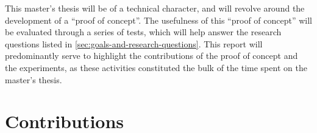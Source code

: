 \begin{comment}
What methodology will you apply to address the goals: theoretic/analytic, model/abstraction or design/experiment?
This section will describe the research methodology applied and the reason for this choice of research methodology.
You should return to the actual choices made in the work and the alternatives in the Discussion chapter.
\end{comment}

This master's thesis will be of a technical character, and will revolve around the development of a \enquote{proof of concept}. The usefulness of this \enquote{proof of concept} will be evaluated through a series of tests, which will help answer the research questions listed in \autoref{sec:goals-and-research-questions}. This report will predominantly serve to highlight the contributions of the proof of concept and the experiments, as these activities constituted the bulk of the time spent on the master's thesis.

\section{Contributions}
\label{sec:intro-contributions}

\begin{comment}
This section just provides a brief summary of the main contributions of the work.
The main description of the contributions will come in Section~\ref{sec:contributions}, after the results are presented.
(Hence Section~\ref{sec:introContributions} can also be left out, leaving the discussion completely to Section~\ref{sec:contributions}.)

The format of this section will generally be as follows:

\begin{enumerate}
    \item \textit{Lorem ipsum dolor sit amet, consectetur adipiscing elit.}
    \item \textit{Lorem ipsum dolor sit amet, consectetur adipiscing elit.}
    \item \textit{Lorem ipsum dolor sit amet, consectetur adipiscing elit.}
\end{enumerate}

\noindent
where the items on the list briefly describe the key contributions.

The order of the contributions here is important. List your main contribution first!
Creating this list will help you not only with writing the Conclusion (where all items listed here definitely should be included, and in more detail),
but also with items that need to be mentioned in the Abstract, as well as with points that you will want to bring to attention in the Discussion.
Hence most of the content on this list will be addressed 4--5 times in your text: here, in the Abstract, Discussion, Conclusion, and (most likely)
in the Results chapter.
\end{comment}

